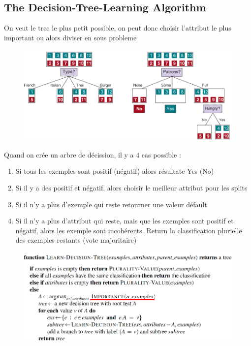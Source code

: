 \documentclass[12pt]{article}
\begin{document}
	\subsection{The Decision-Tree-Learning Algorithm}
		On veut le tree le plus petit possible, on peut donc choisir l'attribut le plus important ou alors diviser en sous probleme
		\begin{figure}[H]
			\centering
			\includegraphics[width=.8\textwidth]{img/DTLA.png}
		\end{figure}
		
		Quand on crée un arbre de décission, il y a 4 cas possible :
		\begin{enumerate}
			\item Si tous les exemples sont positif (négatif) alors résultate Yes (No)
			\item Si il y a des positif et négatif, alors choisir le meilleur attribut pour les splits
			
			\item Si il n'y a plus d'exemple qui reste retourner une valeur défault
			\item Si il n'y a plus d'attribut qui reste, mais que les exemples sont positif et négatif, alors les exemple sont incohérents. Return la classification plurielle des exemples restants (vote majoritaire)
		\end{enumerate}
		
		\begin{figure}[H]
			\centering
			\includegraphics[width=.8\textwidth]{img/DTLA1.png}
		\end{figure}
		
\end{document}
